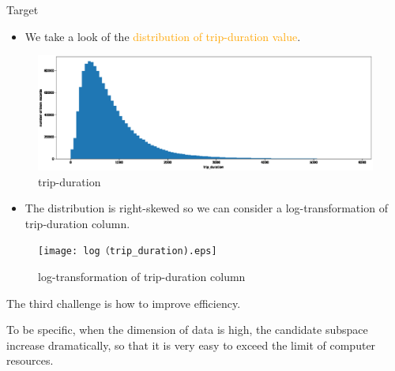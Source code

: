 \documentclass[
 size=14pt,
 paper=smartboard,  %
 mode=present, 		%
 display=slides, 	%
 style=tuliplab,  	%
 pauseslide,
 fleqn,leqno]{powerdot}
\begin{document}
\begin{slide}{Target}

\begin{itemize}
\item
We take a look of the \textcolor{orange}{distribution of trip-duration value}.
\end{itemize}
\begin{figure}
\centering
{}
\includegraphics[scale=0.15]{trip_duration.eps}
\caption{trip-duration}
\end{figure}
\begin{itemize}
\item
The distribution is right-skewed so we can consider a log-transformation of trip-duration column.
\end{itemize}
\begin{figure}
\centering
{}
\texttt{[image: log（trip\_duration).eps]}
\caption{log-transformation of trip-duration column}
\end{figure}

\begin{note}
The third challenge is how to improve efficiency.

To be specific,
when the dimension of data is high,
the candidate subspace increase dramatically,
so that it is very easy to exceed the limit of computer resources.
\end{note}
\end{slide}
\end{document}

